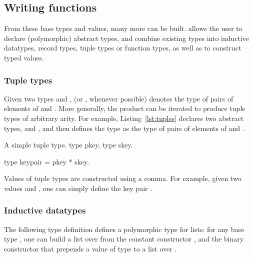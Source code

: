 
\subsection{Writing functions}
From these base types and values, many more can be built. \EasyCrypt allows the
user to declare  (polymorphic) abstract types, and combine existing types into
inductive datatypes, record types, tuple types or function types, as well as to
construct typed values.

\subsubsection*{Tuple types}
Given two types  and ,  (or ,
whenever possible) denotes the type of pairs of elements of  and
. More generally, the product can be iterated to produce tuple types of
arbitrary arity. For example, Listing~\ref{lst:tuples} declares two abstract
types,  and , and then defines the type  as the
type of pairs of elements of  and .


\begin{easycrypt}[label={lst:tuples}]{A simple tuple type.}
type pkey.
type skey.

type keypair = pkey * skey.
\end{easycrypt}

Values of tuple types are constructed using a comma. For example, given two
values  and , one can simply define the key pair
.

\subsubsection*{Inductive datatypes}
The following type definition defines a polymorphic type for lists: for any
base type , one can build a list over  from the constant
constructor , and the binary constructor  that prepends a
value of type  to a list over .

